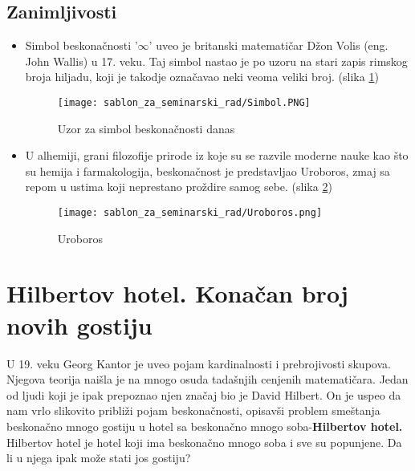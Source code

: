\documentclass[a4paper]{article}
\begin{document}
\subsection{Zanimljivosti}

\begin{itemize}
    \item Simbol beskonačnosti '$\infty$' uveo je britanski matematičar Džon Volis (eng. John Wallis) u 17. veku. Taj simbol nastao je po uzoru na stari zapis rimskog broja hiljadu, koji je takodje označavao neki veoma veliki broj. (slika \ref{fig:Uzor za simbol beskonačnosti danas})
    
    \begin{figure}[ht!]
    \begin{center}
    \texttt{[image: sablon\_za\_seminarski\_rad/Simbol.PNG]}
    \end{center}
    \caption{Uzor za simbol beskonačnosti danas}
    \label{fig:Uzor za simbol beskonačnosti danas}
    \end{figure}
    
    \item U alhemiji, grani filozofije prirode iz koje su se razvile moderne nauke kao što su hemija i farmakologija, beskonačnost je predstavljao Uroboros, zmaj sa repom u ustima koji neprestano proždire samog sebe. (slika \ref{fig:Uroboros})
    
    \begin{figure}[ht!]
    \begin{center}
    \texttt{[image: sablon\_za\_seminarski\_rad/Uroboros.png]}
    \end{center}
    \caption{Uroboros}
    \label{fig:Uroboros}
    \end{figure}
\end{itemize}

\newpage
\section{Hilbertov hotel. Konačan broj novih gostiju}
U 19. veku Georg Kantor je uveo pojam kardinalnosti i prebrojivosti skupova. Njegova teorija naišla je na mnogo osuda tadašnjih cenjenih matematičara.
Jedan od ljudi koji je ipak prepoznao njen značaj bio je David Hilbert.
On je uspeo da nam vrlo slikovito približi pojam beskonačnosti, opisavši problem smeštanja beskonačno mnogo gostiju u hotel sa beskonačno mnogo soba-\textbf{Hilbertov hotel.}
Hilbertov hotel je hotel koji ima beskonačno mnogo soba i sve su popunjene. Da li u njega ipak može stati jos gostiju?
\end{document}
